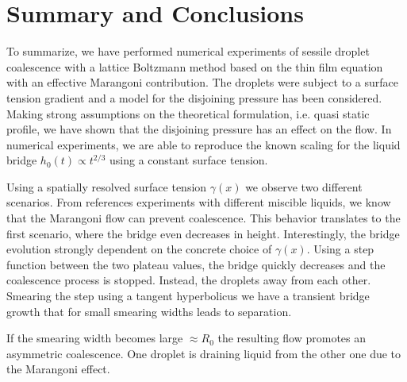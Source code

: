 \documentclass[twocolumn,amsmath,amssymb,showpacs,pre,nofootinbib,superscriptaddress]{revtex4-1} %
\begin{document}
\section{Summary and Conclusions}\label{sec:sum_conclu}

To summarize, we have performed numerical experiments of sessile droplet coalescence with a lattice Boltzmann method based on the thin film equation with an effective Marangoni contribution.
The droplets were subject to a surface tension gradient and a model for the disjoining pressure has been considered.
Making strong assumptions on the theoretical formulation, i.e. quasi static profile, we have shown that the disjoining pressure has an effect on the flow.
In numerical experiments, we are able to reproduce the known scaling for the liquid bridge $h_0(t) \propto t^{2/3}$ using a constant surface tension.

Using a spatially resolved surface tension $\gamma(x)$ we observe two different scenarios.
From references experiments with different miscible liquids, we know that the Marangoni flow can prevent coalescence.
This behavior translates to the first scenario, where the bridge even decreases in height.
Interestingly, the bridge evolution strongly dependent on the concrete choice of $\gamma(x)$.
Using a step function between the two plateau values, the bridge quickly decreases and the coalescence process is stopped.
Instead, the droplets away from each other.
Smearing the step using a tangent hyperbolicus we have a transient bridge growth that for small smearing widths leads to separation.

If the smearing width becomes large $\approx R_0$ the resulting flow promotes an asymmetric coalescence.
One droplet is draining liquid from the other one due to the Marangoni effect. 


\begin{acknowledgements}

\end{acknowledgements}

    
\end{document}
